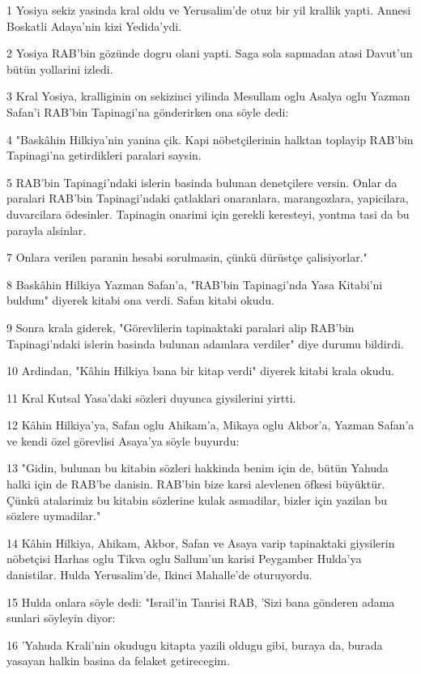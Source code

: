 \par 1 Yosiya sekiz yasinda kral oldu ve Yerusalim'de otuz bir yil krallik yapti. Annesi Boskatli Adaya'nin kizi Yedida'ydi.
\par 2 Yosiya RAB'bin gözünde dogru olani yapti. Saga sola sapmadan atasi Davut'un bütün yollarini izledi.
\par 3 Kral Yosiya, kralliginin on sekizinci yilinda Mesullam oglu Asalya oglu Yazman Safan'i RAB'bin Tapinagi'na gönderirken ona söyle dedi:
\par 4 "Baskâhin Hilkiya'nin yanina çik. Kapi nöbetçilerinin halktan toplayip RAB'bin Tapinagi'na getirdikleri paralari saysin.
\par 5 RAB'bin Tapinagi'ndaki islerin basinda bulunan denetçilere versin. Onlar da paralari RAB'bin Tapinagi'ndaki çatlaklari onaranlara, marangozlara, yapicilara, duvarcilara ödesinler. Tapinagin onarimi için gerekli keresteyi, yontma tasi da bu parayla alsinlar.
\par 7 Onlara verilen paranin hesabi sorulmasin, çünkü dürüstçe çalisiyorlar."
\par 8 Baskâhin Hilkiya Yazman Safan'a, "RAB'bin Tapinagi'nda Yasa Kitabi'ni buldum" diyerek kitabi ona verdi. Safan kitabi okudu.
\par 9 Sonra krala giderek, "Görevlilerin tapinaktaki paralari alip RAB'bin Tapinagi'ndaki islerin basinda bulunan adamlara verdiler" diye durumu bildirdi.
\par 10 Ardindan, "Kâhin Hilkiya bana bir kitap verdi" diyerek kitabi krala okudu.
\par 11 Kral Kutsal Yasa'daki sözleri duyunca giysilerini yirtti.
\par 12 Kâhin Hilkiya'ya, Safan oglu Ahikam'a, Mikaya oglu Akbor'a, Yazman Safan'a ve kendi özel görevlisi Asaya'ya söyle buyurdu:
\par 13 "Gidin, bulunan bu kitabin sözleri hakkinda benim için de, bütün Yahuda halki için de RAB'be danisin. RAB'bin bize karsi alevlenen öfkesi büyüktür. Çünkü atalarimiz bu kitabin sözlerine kulak asmadilar, bizler için yazilan bu sözlere uymadilar."
\par 14 Kâhin Hilkiya, Ahikam, Akbor, Safan ve Asaya varip tapinaktaki giysilerin nöbetçisi Harhas oglu Tikva oglu Sallum'un karisi Peygamber Hulda'ya danistilar. Hulda Yerusalim'de, Ikinci Mahalle'de oturuyordu.
\par 15 Hulda onlara söyle dedi: "Israil'in Tanrisi RAB, 'Sizi bana gönderen adama sunlari söyleyin diyor:
\par 16 'Yahuda Krali'nin okudugu kitapta yazili oldugu gibi, buraya da, burada yasayan halkin basina da felaket getirecegim.
